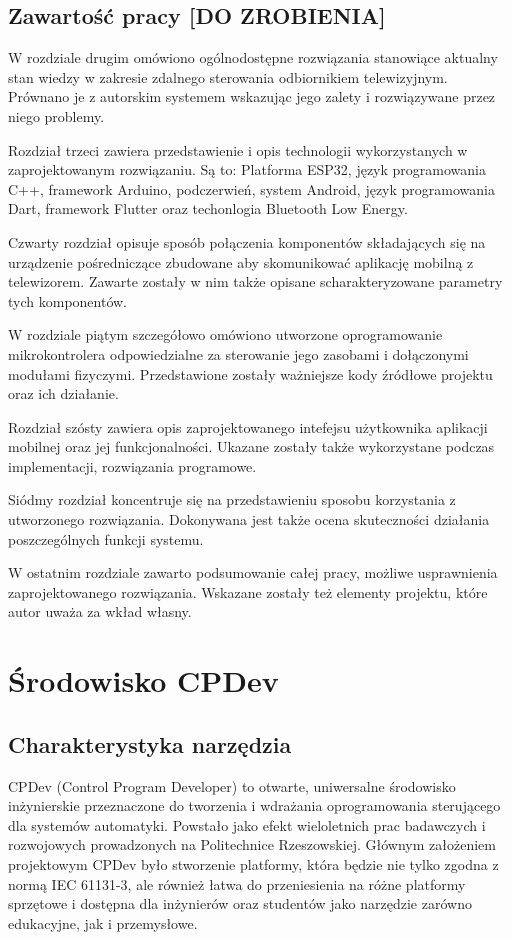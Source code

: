 \documentclass[12pt,twoside]{article}
\begin{document}
\subsection{Zawartość pracy [DO ZROBIENIA]}
W rozdziale drugim  omówiono ogólnodostępne rozwiązania stanowiące aktualny stan wiedzy w zakresie zdalnego sterowania odbiornikiem telewizyjnym. Prównano je z autorskim systemem wskazując jego zalety i rozwiązywane przez niego problemy.

Rozdział trzeci zawiera przedstawienie i opis technologii wykorzystanych w zaprojektowanym rozwiązaniu. Są to: Platforma ESP32, język programowania C++, framework Arduino, podczerwień, system Android, język programowania Dart, framework Flutter oraz techonlogia Bluetooth Low Energy.

Czwarty rozdział opisuje sposób połączenia komponentów składających się na urządzenie pośredniczące zbudowane aby skomunikować aplikację mobilną z telewizorem. Zawarte zostały w nim także opisane scharakteryzowane parametry tych komponentów.

W rozdziale piątym szczegółowo omówiono utworzone oprogramowanie mikrokontrolera odpowiedzialne za sterowanie jego zasobami i dołączonymi modułami fizyczymi. Przedstawione zostały ważniejsze kody źródłowe projektu oraz ich działanie.

Rozdział szósty zawiera opis zaprojektowanego intefejsu użytkownika aplikacji mobilnej oraz jej funkcjonalności. Ukazane zostały także wykorzystane podczas implementacji, rozwiązania programowe.

Siódmy rozdział koncentruje się na przedstawieniu sposobu korzystania z utworzonego rozwiązania. Dokonywana jest także ocena skuteczności działania poszczególnych funkcji systemu.

W ostatnim rozdziale zawarto podsumowanie całej pracy, możliwe usprawnienia zaprojektowanego rozwiązania. Wskazane zostały też elementy projektu, które autor uważa za wkład własny.


\clearpage
\section{Środowisko CPDev}
\subsection{Charakterystyka narzędzia}
CPDev (Control Program Developer) to otwarte, uniwersalne środowisko inżynierskie przeznaczone do tworzenia i wdrażania oprogramowania sterującego dla systemów automatyki. Powstało jako efekt wieloletnich prac badawczych i rozwojowych prowadzonych na Politechnice Rzeszowskiej. Głównym założeniem projektowym CPDev było stworzenie platformy, która będzie nie tylko zgodna z normą IEC 61131-3, ale również łatwa do przeniesienia na różne platformy sprzętowe i dostępna dla inżynierów oraz studentów jako narzędzie zarówno edukacyjne, jak i przemysłowe\cite{cpdevKia}.
\end{document}
